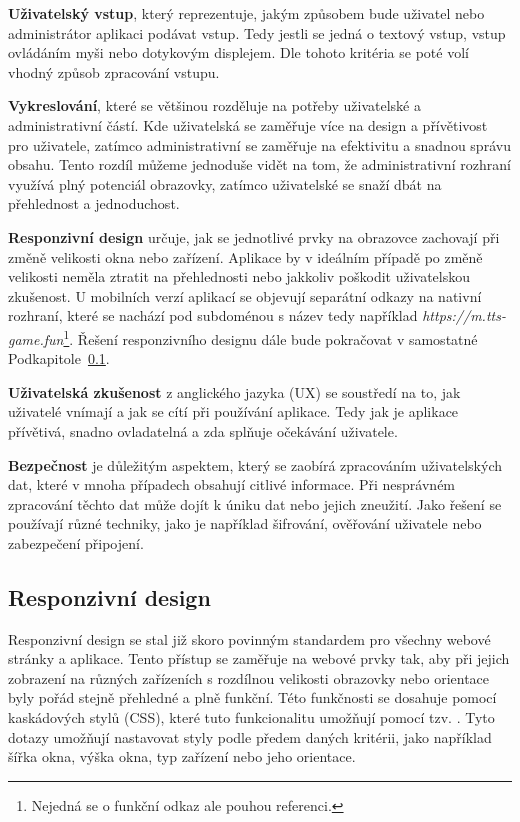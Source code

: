 \begin{description}
    \item \textbf{Uživatelský vstup}, který reprezentuje, jakým způsobem bude uživatel nebo administrátor aplikaci podávat vstup. Tedy jestli se jedná o textový vstup, vstup ovládáním myši nebo dotykovým displejem. Dle tohoto kritéria se poté volí vhodný způsob zpracování vstupu.
    \item \textbf{Vykreslování}, které se většinou rozděluje na potřeby uživatelské a administrativní částí. Kde uživatelská se zaměřuje více na design a přívětivost pro uživatele, zatímco administrativní se zaměřuje na efektivitu a snadnou správu obsahu. Tento rozdíl můžeme jednoduše vidět na tom, že administrativní rozhraní využívá plný potenciál obrazovky, zatímco uživatelské se snaží dbát na přehlednost a jednoduchost.
    \item \textbf{Responzivní design} určuje, jak se jednotlivé prvky na obrazovce zachovají při změně velikosti okna nebo zařízení. Aplikace by v ideálním případě po změně velikosti neměla ztratit na přehlednosti nebo jakkoliv poškodit uživatelskou zkušenost. U mobilních verzí aplikací se objevují separátní odkazy na nativní rozhraní, které se nachází pod subdoménou s název  tedy například \textit{https://m.tts-game.fun}\footnote{Nejedná se o funkční odkaz ale pouhou referenci.}. Řešení responzivního designu dále bude pokračovat v samostatné Podkapitole~\ref{subsec:ui-gui-theory-responsive-design}.
    \item \textbf{Uživatelská zkušenost} z anglického jazyka \textit{} (UX) se soustředí na to, jak uživatelé vnímají a jak se cítí při používání aplikace. Tedy jak je aplikace přívětivá, snadno ovladatelná a zda splňuje očekávání uživatele.
    \item \textbf{Bezpečnost} je důležitým aspektem, který se zaobírá zpracováním uživatelských dat, které v mnoha případech obsahují citlivé informace. Při nesprávném zpracování těchto dat může dojít k úniku dat nebo jejich zneužití. Jako řešení se používají různé techniky, jako je například šifrování, ověřování uživatele nebo zabezpečení připojení.
\end{description}

\subsection{Responzivní design}
\label{subsec:ui-gui-theory-responsive-design}
Responzivní design se stal již skoro povinným standardem pro všechny webové stránky a aplikace. Tento přístup se zaměřuje na webové prvky tak, aby při jejich zobrazení na různých zařízeních s rozdílnou velikosti obrazovky nebo orientace byly pořád stejně přehledné a plně funkční. Této funkčnosti se dosahuje pomocí kaskádových stylů (CSS), které tuto funkcionalitu umožňují pomocí tzv. \textit{}. Tyto dotazy umožňují nastavovat styly podle předem daných kritérii, jako například šířka okna, výška okna, typ zařízení nebo jeho orientace.

